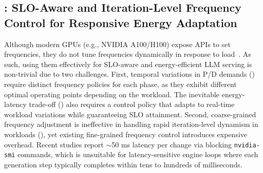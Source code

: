 \subsection{\governor: SLO-Aware and Iteration-Level Frequency Control for Responsive Energy Adaptation} 
\label{subsec:governor}


Although modern GPUs (e.g., NVIDIA A100/H100) expose APIs to set frequencies, they do not tune frequencies dynamically in response to load~\cite{vspetko2021dgx}.
As such, using them effectively for SLO-aware and energy-efficient LLM serving is non-trivial due to two challenges.
First, temporal variations in P/D demands () require distinct frequency policies for each phase, as they exhibit different optimal operating points depending on the workload.
The inevitable energy-latency trade-off () also requires a control policy that adapts to real-time workload variations while guaranteeing SLO attainment.
Second, coarse-grained frequency adjustment is ineffective in handling rapid iteration-level dynamism in workloads (), yet existing fine-grained frequency control introduces expensive overhead.
Recent studies report $\sim$50 ms latency per change via blocking \texttt{nvidia-smi} commands\cite{stojkovic2025dynamollm}, which is unsuitable for latency-sensitive engine loops where each generation step typically completes within tens to hundreds of milliseconds.



